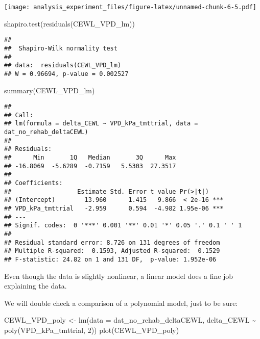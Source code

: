 \documentclass[
]{article}
\newenvironment{Shaded}{\begin{snugshade}}{\end{snugshade}}
\newcommand{\AttributeTok}[1]{\textcolor[rgb]{0.77,0.63,0.00}{#1}}
\newcommand{\DecValTok}[1]{\textcolor[rgb]{0.00,0.00,0.81}{#1}}
\newcommand{\FunctionTok}[1]{\textcolor[rgb]{0.00,0.00,0.00}{#1}}
\newcommand{\NormalTok}[1]{#1}
\newcommand{\OtherTok}[1]{\textcolor[rgb]{0.56,0.35,0.01}{#1}}
\newcommand{\SpecialCharTok}[1]{\textcolor[rgb]{0.00,0.00,0.00}{#1}}
\begin{document}
\texttt{[image: analysis\_experiment\_files/figure-latex/unnamed-chunk-6-5.pdf]}

\begin{Shaded}
\begin{Highlighting}[]
\FunctionTok{shapiro.test}\NormalTok{(}\FunctionTok{residuals}\NormalTok{(CEWL\_VPD\_lm))}
\end{Highlighting}
\end{Shaded}

\begin{verbatim}
## 
##  Shapiro-Wilk normality test
## 
## data:  residuals(CEWL_VPD_lm)
## W = 0.96694, p-value = 0.002527
\end{verbatim}

\begin{Shaded}
\begin{Highlighting}[]
\FunctionTok{summary}\NormalTok{(CEWL\_VPD\_lm)}
\end{Highlighting}
\end{Shaded}

\begin{verbatim}
## 
## Call:
## lm(formula = delta_CEWL ~ VPD_kPa_tmttrial, data = dat_no_rehab_deltaCEWL)
## 
## Residuals:
##      Min       1Q   Median       3Q      Max 
## -16.8069  -5.6289  -0.7159   5.5303  27.3517 
## 
## Coefficients:
##                  Estimate Std. Error t value Pr(>|t|)    
## (Intercept)        13.960      1.415   9.866  < 2e-16 ***
## VPD_kPa_tmttrial   -2.959      0.594  -4.982 1.95e-06 ***
## ---
## Signif. codes:  0 '***' 0.001 '**' 0.01 '*' 0.05 '.' 0.1 ' ' 1
## 
## Residual standard error: 8.726 on 131 degrees of freedom
## Multiple R-squared:  0.1593, Adjusted R-squared:  0.1529 
## F-statistic: 24.82 on 1 and 131 DF,  p-value: 1.952e-06
\end{verbatim}

Even though the data is slightly nonlinear, a linear model does a fine
job explaining the data.

We will double check a comparison of a polynomial model, just to be
sure:

\begin{Shaded}
\begin{Highlighting}[]
\NormalTok{CEWL\_VPD\_poly }\OtherTok{\textless{}{-}} \FunctionTok{lm}\NormalTok{(}\AttributeTok{data =}\NormalTok{ dat\_no\_rehab\_deltaCEWL,}
\NormalTok{                               delta\_CEWL }\SpecialCharTok{\textasciitilde{}} \FunctionTok{poly}\NormalTok{(VPD\_kPa\_tmttrial, }\DecValTok{2}\NormalTok{))}
\FunctionTok{plot}\NormalTok{(CEWL\_VPD\_poly)}
\end{Highlighting}
\end{Shaded}
\end{document}
